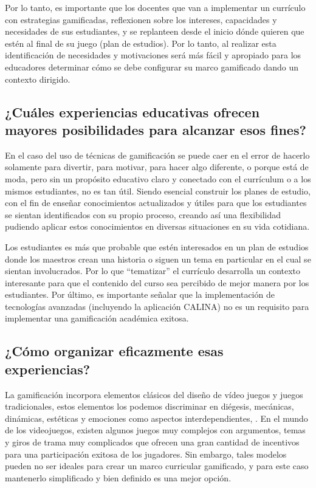 Por lo tanto, es importante que los docentes que van a implementar un currículo con estrategias gamificadas, 
reflexionen sobre los intereses, capacidades y necesidades de sus estudiantes, y se replanteen desde el inicio 
dónde quieren que estén al final de su juego (plan de estudios). Por lo tanto, al realizar esta identificación 
de necesidades y motivaciones será más fácil y apropiado para los educadores determinar cómo se debe 
configurar su marco gamificado dando un contexto dirigido.

\subsection{¿Cuáles experiencias educativas ofrecen mayores posibilidades para alcanzar esos fines?}

En el caso del uso de técnicas de gamificación se puede caer en el error de hacerlo solamente para divertir, 
para motivar, para hacer algo diferente, o porque está de moda, pero sin un propósito educativo claro y 
conectado con el currículum o a los mismos estudiantes, no es tan útil. Siendo esencial construir los planes 
de estudio, con el fin de enseñar conocimientos actualizados y útiles para que los estudiantes se sientan 
identificados con su propio proceso, creando así una flexibilidad pudiendo aplicar estos conocimientos en 
diversas situaciones en su vida cotidiana.

Los estudiantes es más que probable que estén interesados en un plan de estudios donde los maestros crean una 
historia o siguen un tema en particular en el cual se sientan involucrados. Por lo que ``tematizar'' el 
currículo desarrolla un contexto interesante para que el contenido del curso sea percibido de mejor manera por 
los estudiantes. Por último, es importante señalar que la implementación de tecnologías avanzadas (incluyendo 
la aplicación CALINA) no es un requisito para implementar una gamificación académica exitosa.

\subsection{¿Cómo organizar eficazmente esas experiencias?}

La gamificación incorpora elementos clásicos del diseño de vídeo juegos y juegos tradicionales, estos 
elementos los podemos discriminar en diégesis, mecánicas, dinámicas, estéticas y emociones como aspectos 
interdependientes, . En el mundo de los videojuegos, existen algunos juegos muy complejos 
con argumentos, temas y giros de trama muy complicados que ofrecen una gran cantidad de incentivos para una 
participación exitosa de los jugadores. Sin embargo, tales modelos pueden no ser ideales para crear un marco 
curricular gamificado, y para este caso mantenerlo simplificado y bien definido es una mejor opción.

